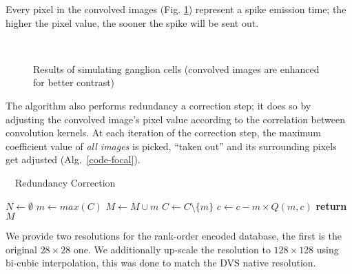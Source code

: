 Every pixel in the convolved images (Fig. \ref{fig-convolution-results}) 
represent a spike emission time; the higher the pixel value, the sooner the 
spike will be sent out.

\begin{figure}[hbt]
  \centering
  \\
  \caption{Results of simulating ganglion cells (convolved images are enhanced for better contrast)}
  \label{fig-convolution-results}
\end{figure}

The algorithm also performs redundancy a correction step; it does so by 
adjusting the convolved image's pixel value according to the correlation 
between convolution kernels. At each iteration of the correction step, the 
maximum coefficient value of \emph{all images} is picked, ``taken out'' and its 
surrounding pixels get adjusted (Alg.~\ref{code-focal}).

\begin{algorithm}
  \caption{~~Redundancy Correction}
  \label{code-focal}
  \begin{algorithmic}
      \State $N \leftarrow \emptyset$ 
      \Repeat
        \State $m \leftarrow max(C)$ 
        \State $M \leftarrow M \cup m$ 
        \State $C \leftarrow C \setminus \{m\}$ 
         
           
            \State $c \leftarrow c - m \times Q(m, c)$
          \EndIf
        \EndFor
      \State \textbf{return} $M$
    \EndProcedure
  \end{algorithmic}
\end{algorithm}

We provide two resolutions for the rank-order encoded database, the first is 
the original $28\times28$ one. We additionally up-scale the resolution to 
$128\times128$ using bi-cubic interpolation, this was done to match the DVS 
native resolution.